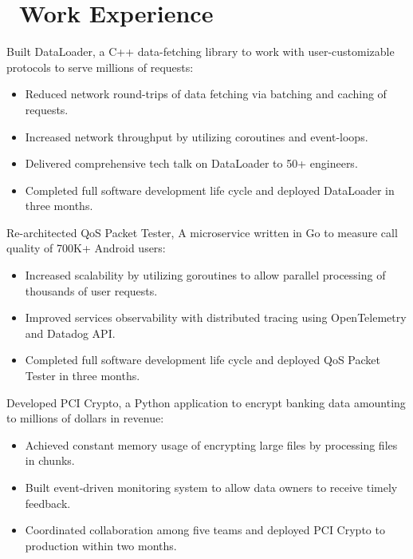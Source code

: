 \documentclass{resume}
\begin{document}
\section{\faUsers\ Work Experience}
Built DataLoader, a C++ data-fetching library to work with user-customizable protocols to serve millions of requests:
\begin{itemize}
  \item {Reduced network round-trips of data fetching via batching and caching of requests.}
  \item {Increased network throughput by utilizing coroutines and event-loops.}
  \item {Delivered comprehensive tech talk on DataLoader to 50+ engineers.}
  \item {Completed full software development life cycle and deployed DataLoader in three months.}
\end{itemize}

Re-architected QoS Packet Tester, A microservice written in Go to measure call quality of 700K+ Android users:
\begin{itemize}
  \item {Increased scalability by utilizing goroutines to allow parallel processing of thousands of user requests.}
  \item {Improved services observability with distributed tracing using OpenTelemetry and Datadog API.}
  \item {Completed full software development life cycle and deployed QoS Packet Tester in three months.}
\end{itemize}

Developed PCI Crypto, a Python application to encrypt banking data amounting to millions of dollars in revenue:
\begin{itemize}
  \item {Achieved constant memory usage of encrypting large files by processing files in chunks.}
  \item {Built event-driven monitoring system to allow data owners to receive timely feedback.}
  \item {Coordinated collaboration among five teams and deployed PCI Crypto to production within two months.}
\end{itemize}
\end{document}
